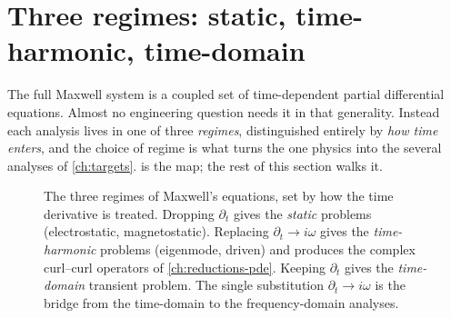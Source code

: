 \section{Three regimes: static, time-harmonic, time-domain}
\label{sec:regimes}

The full Maxwell system is a coupled set of time-dependent partial differential
equations. Almost no engineering question needs it in that generality. Instead
each analysis lives in one of three \emph{regimes}, distinguished entirely by
\emph{how time enters}, and the choice of regime is what turns the one physics
into the several analyses of \cref{ch:targets}.  is the map;
the rest of this section walks it.

\begin{figure}[t]
\centering
{}
\caption[The three regimes]{The three regimes of Maxwell's equations, set by
how the time derivative is treated. Dropping $\partial_t$ gives the
\emph{static} problems (electrostatic, magnetostatic). Replacing
$\partial_t\to i\omega$ gives the \emph{time-harmonic} problems (eigenmode,
driven) and produces the complex curl--curl operators of
\cref{ch:reductions-pde}. Keeping $\partial_t$ gives the \emph{time-domain}
transient problem. The single substitution $\partial_t\to i\omega$ is the
bridge from the time-domain to the frequency-domain analyses.}
\label{fig:regimes}
\end{figure}

